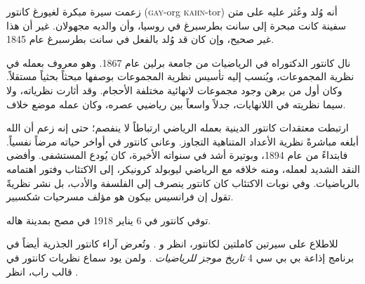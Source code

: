 \documentclass[../../../include/open-logic-section]{subfiles}
\begin{document}



زعمت سيرة مبكرة لغيورغ كانتور (\textsc{gay}-org
\textsc{kahn}-tor) أنه وُلد وعُثر عليه على متن سفينة كانت مبحرة إلى
سانت بطرسبرغ في روسيا، وأن والديه مجهولان. غير أن هذا غير صحيح، وإن كان
قد وُلد بالفعل في سانت بطرسبرغ عام 1845.

نال كانتور الدكتوراه في الرياضيات من جامعة برلين عام 1867. وهو معروف
بعمله في نظرية المجموعات، ويُنسب إليه تأسيس نظرية المجموعات بوصفها مبحثاً
بحثياً مستقلاً. وكان أول من برهن وجود مجموعات لانهائية مختلفة الأحجام.
وقد أثارت نظرياته، ولا سيما نظريته في اللانهايات، جدلاً واسعاً بين
رياضيي عصره، وكان عمله موضع خلاف.

ارتبطت معتقدات كانتور الدينية بعمله الرياضي ارتباطاً لا ينفصم؛ حتى إنه
زعم أن الله أبلغه مباشرةً نظرية الأعداد المتناهية التجاوز. وعانى كانتور
في أواخر حياته مرضاً نفسياً. فابتداءً من عام 1894، وبوتيرة أشد في سنواته
الأخيرة، كان يُودع المستشفى. وأفضى النقد الشديد لعمله، ومنه خلافه مع
الرياضي ليوبولد كرونيكر، إلى الاكتئاب وفتور اهتمامه بالرياضيات. وفي نوبات
الاكتئاب كان كانتور ينصرف إلى الفلسفة والأدب، بل نشر نظريةً تقول إن
فرانسيس بيكون هو مؤلف مسرحيات شكسبير.

توفي كانتور في 6 يناير 1918 في مصح بمدينة هاله.

\begin{reading}
للاطلاع على سيرتين كاملتين لكانتور، انظر \citet{Dauben1990} و
\citet{Grattan-Guinness1971}. وتُعرض آراء كانتور الجذرية أيضاً في برنامج
إذاعة بي بي سي 4 \emph{تاريخ موجز للرياضيات} \citep{Sautoy2014}.
ولمن يود سماع نظريات كانتور في قالب راب، انظر \citet{Rose2012}.
\end{reading}
\end{document}
